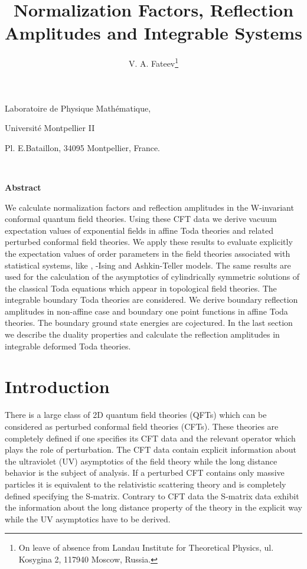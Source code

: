 \documentclass[a4paper,12pt]{article}
\begin{document}
\textwidth=15.8cm
\textheight=21cm
\author{V. A. Fateev\thanks{On leave of absence from Landau 
Institute for Theoretical Physics, ul.
Kosygina 2, 117940 Moscow, Russia.}}
\title{Normalization Factors, Reflection Amplitudes and Integrable Systems}
\date{}
\maketitle

\begin{center}
Laboratoire de Physique Math\'{e}matique,

Universit\'{e} Montpellier II

Pl. E.Bataillon, 34095 Montpellier, France.
\end{center}

\bigskip\ 

\begin{center}
{\bf Abstract}
\end{center}

We calculate normalization factors and reflection amplitudes in the
W-invariant conformal quantum field theories. Using these CFT data we derive
vacuum expectation values of exponential fields in affine Toda theories and
related perturbed conformal field theories. We apply these results to evaluate 
explicitly the expectation values of order parameters in the field theories 
associated with statistical systems, like \coordHE{}, \coordHE{}-Ising and Ashkin-Teller 
models. The same results are used for the calculation of the 
asymptotics of cylindrically symmetric solutions of the classical Toda
equations which appear in topological field theories. 
The integrable boundary Toda theories are considered. We derive
boundary reflection amplitudes in non-affine case and boundary one point
functions in affine Toda theories. The boundary ground state energies are 
cojectured. In the last section we describe the duality 
properties and calculate the reflection amplitudes in 
integrable deformed Toda theories.


\section{ Introduction}

There is a large class of 2D quantum field theories (QFTs) which can be
considered as perturbed conformal field theories (CFTs). These theories are
completely defined if one specifies its CFT data and the relevant operator
which plays the role of perturbation. The CFT data contain explicit
information about the ultraviolet (UV) asymptotics of the field theory while
the long distance behavior is the subject of analysis. If a perturbed CFT
contains only massive particles it is equivalent to the relativistic
scattering theory and is completely defined specifying the S-matrix.
Contrary to CFT data the S-matrix data exhibit the information about the
long distance property of the theory in the explicit way while the UV
asymptotics have to be derived.
\end{document}
